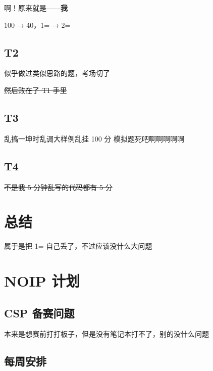 \documentclass[a4paper, 12pt]{article}
\begin{document}
啊！原来就是——\textbf{我}

100 → 40，1= → 2=

\subsection{T2}

似乎做过类似思路的题，考场切了

\sout{然后败在了 T1 手里}

\subsection{T3}

乱搞一坤时\quad 乱调大样例\quad 乱挂 100 分
{\Huge{模拟题死吧啊啊啊啊啊}}

\subsection{T4}

\sout{不是我 5 分钟乱写的代码都有 5 分}

\section{总结}

属于是把 1= 自己丢了，不过应该没什么大问题

\section{NOIP 计划}

\subsection{CSP 备赛问题}

本来是想赛前打打板子，但是没有笔记本打不了，别的没什么问题

\subsection{每周安排}
\end{document}

